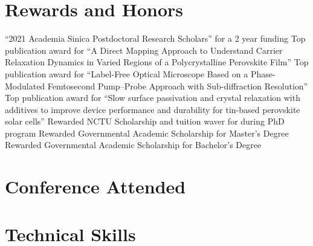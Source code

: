 \documentclass[11pt,a4paper]{moderncv}
\begin{document}
\section{Rewards and Honors}
        {``2021 Academia Sinica Postdoctoral 
        Research Scholars'' for a 2 year funding}
        {Top publication award for ``A Direct Mapping 
        Approach to Understand Carrier Relaxation 
        Dynamics in Varied Regions of a 
        Polycrystalline Perovskite Film''}
        {Top publication award for ``Label-Free Optical 
        Microscope Based on a Phase-Modulated Femtosecond 
        Pump–Probe Approach with Sub-diffraction Resolution''}
        {Top publication award for ``Slow surface 
        passivation and crystal relaxation with additives to 
        improve device performance and durability for tin-based 
        perovskite solar cells''}
        {Rewarded NCTU Scholarship and tuition waver 
        for during PhD program}
        {Rewarded Governmental Academic Scholarship 
        for Master's Degree}
        {Rewarded Governmental Academic Scholarship 
        for Bachelor's Degree}
\section{Conference Attended}
\section{Technical Skills}
\end{document}
